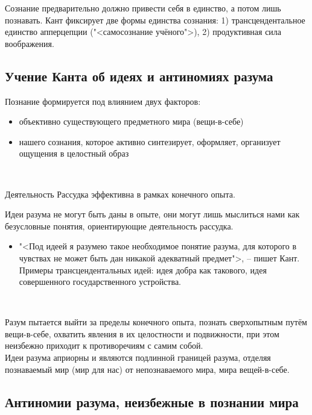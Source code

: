 \documentclass[main.tex]{subfiles}
\begin{document}
{\parindent0pt
Сознание предварительно должно привести себя в единство, а потом лишь познавать.
Кант фиксирует две формы единства сознания: 1) трансцендентальное единство апперцепции ("<самосознание учёного">), 2) продуктивная сила воображения.
}



\subsection{Учение Канта об идеях и антиномиях разума}

{\parindent0pt
Познание формируется под влиянием двух факторов:
\begin{itemize}[nosep,leftmargin=0.5cm]
\item объективно существующего предметного мира (вещи-в-себе)
\item нашего сознания, которое активно синтезирует, оформляет, организует ощущения в целостный образ
\end{itemize}
}
\

{\parindent0pt
Деятельность Рассудка эффективна в рамках конечного опыта.
}
\ \\

{\parindent0pt
Идеи разума не могут быть даны в опыте, они могут лишь мыслиться нами как безусловные понятия, ориентирующие деятельность рассудка.
\begin{itemize}[nosep,leftmargin=0.5cm]
\item "<Под идеей я разумею такое необходимое понятие разума, для которого в чувствах не может быть дан никакой адекватный предмет">, -- пишет Кант.
Примеры трансцендентальных идей: идея добра как такового, идея совершенного государственного устройства.
\end{itemize}
}
\ 

{\parindent0pt
Разум пытается выйти за пределы конечного опыта, познать сверхопытным путём вещи-в-себе, охватить явления в их целостности и подвижности, при этом неизбежно приходит к противоречиям с самим собой.
}
\ \\

{\parindent0pt
Идеи разума априорны и являются подлинной границей разума, отделяя познаваемый мир (мир для нас) от непознаваемого мира, мира вещей-в-себе.
}



\subsection{Антиномии разума, неизбежные в познании мира}
\end{document}
